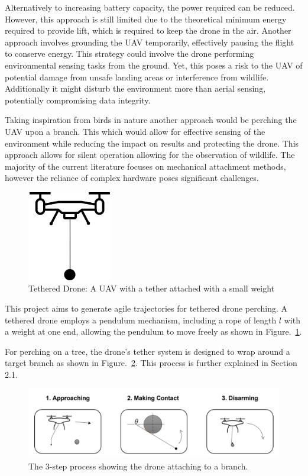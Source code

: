Alternatively to increasing battery capacity, the power required can be reduced.
However, this approach is still limited due to the theoretical minimum energy required to provide lift, which is required to keep the drone in the air.
Another approach involves grounding the UAV temporarily, effectively pausing the flight to conserve energy.
This strategy could involve the drone performing environmental sensing tasks from the ground.
Yet, this poses a risk to the UAV of potential damage from unsafe landing areas or interference from wildlife.
Additionally it might disturb the environment more than aerial sensing, potentially compromising data integrity.

Taking inspiration from birds in nature another approach would be perching the UAV upon a branch.
This which would allow for effective sensing of the environment while reducing the impact on results and protecting the drone.
This approach allows for silent operation allowing for the observation of wildlife.
The majority of the current literature focuses on mechanical attachment methods, however the reliance of complex hardware poses significant challenges.

\begin{figure}[H]
  \centering
  \includegraphics[width=0.33\textwidth]{introduction/TetheredDrone.drawio.png}
  \caption{Tethered Drone: A UAV with a tether attached with a small weight}
\label{fig:intro-tethered-drone}
\end{figure}

This project aims to generate agile trajectories for tethered drone perching.
A tethered drone employs a pendulum mechanism, including a rope of length $l$ with a weight at one end, allowing the pendulum to move freely as shown in Figure.~\ref{fig:intro-tethered-drone}.

For perching on a tree, the drone's tether system is designed to wrap around a target branch as shown in Figure.~\ref{fig:intro-wrapping}.
This process is further explained in Section 2.1.

\begin{figure}[htbp]
  \centering
  \includegraphics[width=\textwidth]{introduction/dronePerching.png}
  \caption{The 3-step process showing the drone attaching to a branch.}
\label{fig:intro-wrapping}
\end{figure}


